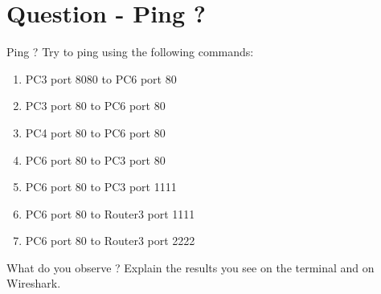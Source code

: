 \section{Question - Ping ?}

\begin{questionBox}{Ping ?}
    Try to ping using the following commands:

    \begin{enumerate}
        \item PC3 port 8080 to PC6 port 80
        \item PC3 port 80 to PC6 port 80
        \item PC4 port 80 to PC6 port 80
        \item PC6 port 80 to PC3 port 80
        \item PC6 port 80 to PC3 port 1111
        \item PC6 port 80 to Router3 port 1111
        \item PC6 port 80 to Router3 port 2222
    \end{enumerate}
    
    What do you observe ? Explain the results you see on the terminal and on Wireshark.
\end{questionBox}
